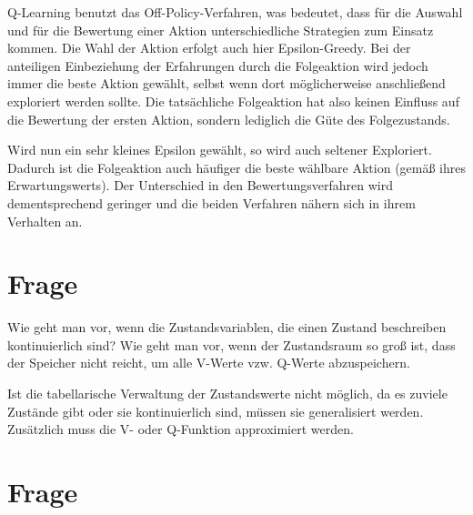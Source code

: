 \documentclass[10pt]{scrartcl}
\begin{document}
Q-Learning benutzt das Off-Policy-Verfahren, was bedeutet, dass für die Auswahl und für die Bewertung einer Aktion unterschiedliche Strategien zum Einsatz kommen. Die Wahl der Aktion erfolgt auch hier Epsilon-Greedy. Bei der anteiligen Einbeziehung der Erfahrungen durch die Folgeaktion wird jedoch immer die beste Aktion gewählt, selbst wenn dort möglicherweise anschließend exploriert werden sollte. Die tatsächliche Folgeaktion hat also keinen Einfluss auf die Bewertung der ersten Aktion, sondern lediglich die Güte des Folgezustands.

Wird nun ein sehr kleines Epsilon gewählt, so wird auch seltener Exploriert. Dadurch ist die Folgeaktion auch häufiger die beste wählbare Aktion (gemäß ihres Erwartungswerts). Der Unterschied in den Bewertungsverfahren wird dementsprechend geringer und die beiden Verfahren nähern sich in ihrem Verhalten an.

\section{Frage}
Wie geht man vor, wenn die Zustandsvariablen, die einen Zustand beschreiben kontinuierlich sind? Wie geht man vor, wenn der Zustandsraum so groß ist, dass der Speicher nicht reicht, um alle V-Werte vzw. Q-Werte abzuspeichern.

Ist die tabellarische Verwaltung der Zustandswerte nicht möglich, da es zuviele Zustände gibt oder sie kontinuierlich sind, müssen sie generalisiert werden. Zusätzlich muss die V- oder Q-Funktion approximiert werden.




\section{Frage}
\end{document}

